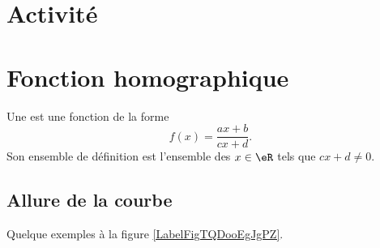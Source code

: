 
\section*{Activité}



\section{Fonction homographique}

\begin{definition}
    Une  est une fonction de la forme
    \begin{equation}
        f(x)=\frac{ ax+b }{ cx+d }.
    \end{equation}
Son ensemble de définition est l'ensemble des \( x\in \eR\) tels que \( cx+d\neq 0\).
\end{definition}

\subsection{Allure de la courbe}



Quelque exemples à la figure \ref{LabelFigTQDooEgJgPZ}. %

\newpage

\newcommand{\CaptionFigTQDooEgJgPZ}{Des fonctions homographiques}


\newpage


